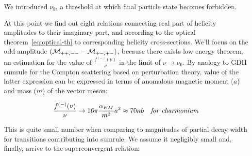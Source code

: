 We introduced $\nu_0$, a threshold at which final particle state becomes forbidden.

At this point we find out eight relations connecting real part of helicity amplitudes to their imaginary part, and according to the optical theorem~\cref{eq:optical-th} to corresponding helicity cross-sections. We'll focus on the odd amplitude $(\mathcal{M}_{++,--} - \mathcal{M}_{+-,+-})$, because there exists low energy theorem, an estimation for the value of $\frac{f^{(-)}(\nu)}{\nu}$ in the limit of $\nu \rightarrow \nu_0$. By analogy to GDH sumrule for the Compton scattering based on perturbation theory, value of the latter expression can be expressed in terms of anomalous magnetic moment ($a$) and mass ($m$) of the vector meson:

\begin{align}
    \frac{f^{(-)}(\nu)}{\nu} \rightarrow 16 \pi \frac{\alpha_{EM}}{m^2} a^2 \approx 70 nb \text{\quad \textit{for charmonium}}
\end{align}

This is quite small number when comparing to magnitudes of partial decay width for transitions contributing into sumrule. We assume it negligibly small and, finally, arrive to the superconvergent relation:

\begin{center}
\end{center}


